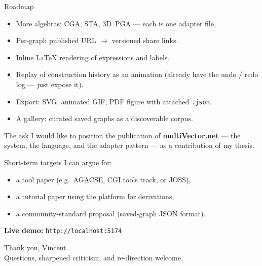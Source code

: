 \documentclass[aspectratio=169,11pt]{beamer}
\begin{document}
\begin{frame}{Roadmap}
  \begin{itemize}
    \item More algebras: CGA, STA, 3D~PGA — each is one adapter file.
    \item Per-graph published URL \(\rightarrow\) versioned share links.
    \item Inline LaTeX rendering of expressions and labels.
    \item Replay of construction history as an animation
          (already have the undo / redo log — just expose it).
    \item Export: SVG, animated GIF, PDF figure with attached \texttt{.json}.
    \item A gallery: curated saved graphs as a discoverable corpus.
  \end{itemize}
\end{frame}

\begin{frame}{The ask}
  I would like to position the publication of
  \textbf{multiVector.net} —
  the system, the language, and the adapter pattern —
  as a contribution of my thesis.

  \medskip
  Short-term targets I can argue for:
  \begin{itemize}
    \item a tool paper (e.g.\ AGACSE, CGI tools track, or JOSS),
    \item a tutorial paper using the platform for derivations,
    \item a community-standard proposal (saved-graph JSON format).
  \end{itemize}

  \medskip
  \centering
  \alert{\textbf{Live demo:} \texttt{http://localhost:5174}}
\end{frame}

\begin{frame}[standout]
  Thank you, Vincent.\\[4pt]
  \footnotesize\normalfont
  Questions, sharpened criticism, and re-direction welcome.
\end{frame}
\end{document}
